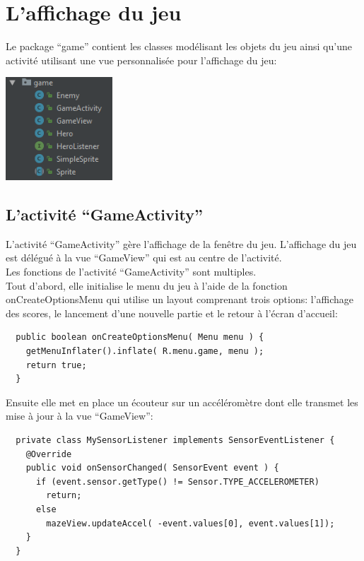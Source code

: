 \documentclass{article}
\begin{document}
\section{L'affichage du jeu}

Le package \enquote{game} contient les classes modélisant les objets du jeu ainsi qu'une activité utilisant une vue personnalisée pour l'affichage du jeu:
\begin{center}
  \includegraphics[width=4cm]{game_package.png}
\end{center}

\subsection{L'activité \enquote{GameActivity}}
L'activité \enquote{GameActivity} gère l'affichage de la fenêtre du jeu. L'affichage du jeu est délégué à la vue \enquote{GameView} qui est au centre de l'activité.\\
Les fonctions de l'activité \enquote{GameActivity} sont multiples.\\

Tout d'abord, elle initialise le menu du jeu à l'aide de la fonction onCreateOptionsMenu qui utilise un layout comprenant trois options: l'affichage des scores, le lancement d'une nouvelle partie et le retour à l'écran d'accueil:
  \begin{verbatim}
  public boolean onCreateOptionsMenu( Menu menu ) {
    getMenuInflater().inflate( R.menu.game, menu );
    return true;
  }
  \end{verbatim}

Ensuite elle met en place un écouteur sur un accéléromètre dont elle transmet les mise à jour à la vue \enquote{GameView}:
  \begin{verbatim}
  private class MySensorListener implements SensorEventListener {
    @Override
    public void onSensorChanged( SensorEvent event ) {
      if (event.sensor.getType() != Sensor.TYPE_ACCELEROMETER)
        return;
      else
        mazeView.updateAccel( -event.values[0], event.values[1]);
    }
  }
  \end{verbatim}
\end{document}
